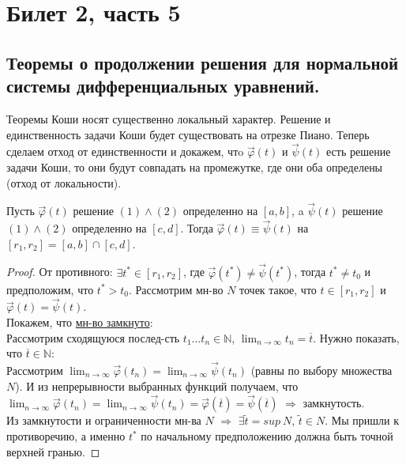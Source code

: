 



    \section*{Билет 2, часть 5}
    \subsection*{Теоремы о продолжении решения для нормальной системы дифференциальных уравнений.}

    Теоремы Коши носят существенно локальный характер. Решение и единственность задачи Коши будет существовать на отрезке Пиано. Теперь сделаем отход от единственности и докажем, чтo $\Vec{\varphi}(t)$ и $\Vec{\psi}(t)$ есть решение задачи Коши, то они будут совпадать на промежутке, где они оба определены (отход от локальности).

	\begin{theorem}
		Пусть $\Vec{\varphi}(t)$ решение $(1) \wedge (2)$ определенно на $[a, b]$, a  $\Vec{\psi}(t)$ решение $(1) \wedge (2)$ определенно на $[c, d]$.
		Тогда $\Vec{\varphi}(t) \equiv \Vec{\psi}(t)$ на $[r_1, r_2] = [a, b] \cap [c, d]$.
	\end{theorem}
	\begin{proof}
        От противного: $\exists t^* \in [r_1, r_2]$, где $\Vec{\varphi}(t^*) \neq \Vec{\psi}(t^*)$, тогда $t^* \neq t_0$ и предположим, что $t^* > t_0$. 
        Рассмотрим мн-во $N$ точек такое, что $t \in [r_1, r_2]$ и $\Vec{\varphi}(t) = \Vec{\psi}(t)$. \\
        Покажем, что \underline{мн-во замкнуто}: \\
        Рассмотрим сходящуюся послед-сть $t_1 \ldots t_n \in \mathbb{N}$, $\displaystyle \lim_{n\to\infty} t_n = \overline{t}$. Нужно показать, что $\overline{t} \in \mathbb{N}$:\\
        Рассмотрим $\displaystyle \lim_{n\to\infty} \Vec{\varphi}(t_n) = \lim_{n\to\infty} \Vec{\psi}(t_n)$ (равны по выбору множества $N$). И из непрерывности выбранных функций получаем, что $\displaystyle \lim_{n\to\infty} \Vec{\varphi}(t_n) = \lim_{n\to\infty} \Vec{\psi}(t_n) = \Vec{\varphi}(\overline{t}) = \Vec{\psi}(\overline{t})$ $\Rightarrow$ замкнутость. \\
        Из замкнутости и ограниченности мн-ва $N$ $\Rightarrow$ $\exists \widetilde{t} = sup\ N$, $\widetilde{t} \in N$. Мы пришли к противоречию, а именно $t^*$ по начальному предположению должна быть точной верхней гранью.
    \end{proof}
    
